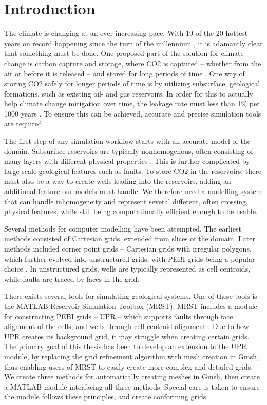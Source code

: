 \section{Introduction}
The climate is changing at an ever-increasing pace. With 19 of the 20 hottest years on record happening since the turn of the millennium \cite{NASA-climate}, it is adamantly clear that something must be done. One proposed part of the solution for climate change is carbon capture and storage, where CO2 is captured -- whether from the air or before it is released -- and stored for long periods of time \cite{climate-mitigation}. One way of storing CO2 safely for longer periods of time is by utilizing subsurface, geological formations, such as existing oil- and gas reservoirs. In order for this to actually help climate change mitigation over time, the leakage rate must less than 1\% per 1000 years \cite{Shaffer-CO2-capture}. To ensure this can be achieved, accurate and precise simulation tools are required.

The first step of any simulation workflow starts with an accurate model of the domain. Subsurface reservoirs are typically nonhomogenous, often consisting of many layers with different physical properties \cite{UPR_thesis}. This is further complicated by large-scale geological features such as faults. To store CO2 in the reservoirs, there must also be a way to create wells leading into the reservoirs, adding an additional feature our models must handle. We therefore need a modelling system that can handle inhomogeneity and represent several different, often crossing, physical features, while still being computationally efficient enough to be usable.

Several methods for computer modelling have been attempted. The earliest methods consisted of Cartesian grids, extended from slices of the domain. Later methods included corner point grids -- Cartesian grids with irregular polygons, which further evolved into unstructured grids, with PEBI grids being a popular choice \cite{UPR_thesis}. In unstructured grids, wells are typically represented as cell centroids, while faults are traced by faces in the grid.

There exists several tools for simulating geological systems. One of these tools is the MATLAB Reservoir Simulation Toolbox (MRST). MRST includes a module for constructing PEBI grids -- UPR -- which supports faults through face alignment of the cells, and wells through cell centroid alignment \cite{UPR_chapter}. Due to how UPR creates its background grid, it may struggle when creating certain grids. The primary goal of this thesis has been to develop an extension to the UPR module, by replacing the grid refinement algorithm with mesh creation in Gmsh, thus enabling users of MRST to easily create more complex and detailed grids. We create three methods for automatically creating meshes in Gmsh, then create a MATLAB module interfacing all three methods. Special care is taken to ensure the module follows these principles, and create conforming grids.


